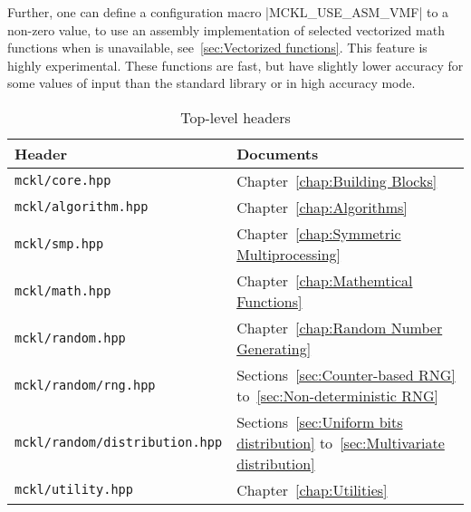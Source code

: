 Further, one can define a configuration macro |MCKL_USE_ASM_VMF| to a non-zero
value, to use an assembly implementation of selected vectorized math functions
when \mkl \vml is unavailable, see~\ref{sec:Vectorized functions}. This feature
is highly experimental. These functions are fast, but have slightly lower
accuracy for some values of input than the standard library or \mkl \vml in
high accuracy mode.

\begin{table}[ht]
  \begin{tabularx}{\textwidth}{LL}
    \toprule
    Header & Documents \\
    \midrule
    \texttt{mckl/core.hpp}     & Chapter~\ref{chap:Building Blocks}          \\
    \texttt{mckl/algorithm.hpp}& Chapter~\ref{chap:Algorithms}               \\
    \texttt{mckl/smp.hpp}      & Chapter~\ref{chap:Symmetric Multiprocessing}\\
    \texttt{mckl/math.hpp}     & Chapter~\ref{chap:Mathemtical Functions}    \\
    \texttt{mckl/random.hpp}   & Chapter~\ref{chap:Random Number Generating} \\
    \texttt{mckl/random/rng.hpp}
    & Sections~\ref{sec:Counter-based RNG}
    to~\ref{sec:Non-deterministic RNG} \\
    \texttt{mckl/random/distribution.hpp}
    & Sections~\ref{sec:Uniform bits distribution}
    to~\ref{sec:Multivariate distribution} \\
    \texttt{mckl/utility.hpp} & Chapter~\ref{chap:Utilities} \\
    \bottomrule
  \end{tabularx}
  \caption{Top-level headers}
  \label{tab:headers}
\end{table}
